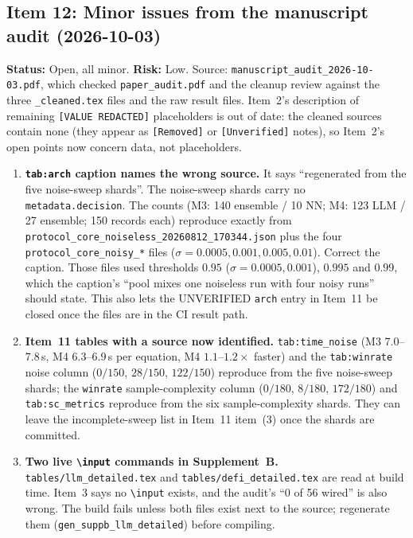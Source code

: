 \documentclass[11pt]{article}
\begin{document}
\subsection*{Item 12: Minor issues from the manuscript audit (2026-10-03)}
\textbf{Status:} Open, all minor. \textbf{Risk:} Low. Source: \texttt{manuscript\_audit\_2026-10-03.pdf}, which checked
\texttt{paper\_audit.pdf} and the cleanup review against the three \texttt{\_cleaned.tex} files and the raw result files.
Item~2's description of remaining \texttt{[VALUE REDACTED]} placeholders is out of date: the cleaned sources contain none (they
appear as \texttt{[Removed]} or \texttt{[Unverified]} notes), so Item~2's open points now concern data, not placeholders.
\begin{enumerate}
  \item \textbf{\texttt{tab:arch} caption names the wrong source.} It says ``regenerated from the five noise-sweep shards''.
    The noise-sweep shards carry no \texttt{metadata.decision}. The counts (M3: 140 ensemble / 10 NN; M4: 123 LLM / 27
    ensemble; 150 records each) reproduce exactly from \texttt{protocol\_core\_noiseless\_20260812\_170344.json} plus the four
    \texttt{protocol\_core\_noisy\_*} files ($\sigma=0.0005, 0.001, 0.005, 0.01$). Correct the caption. Those files
    used thresholds $0.95$ ($\sigma=0.0005, 0.001$), $0.995$ and $0.99$, which the caption's ``pool mixes one noiseless run with
    four noisy runs'' should state. This also lets the UNVERIFIED \texttt{arch} entry in Item~11 be closed once the files
    are in the CI result path.
  \item \textbf{Item~11 tables with a source now identified.} \texttt{tab:time\_noise} (M3 7.0--7.8\,s, M4 6.3--6.9\,s per
    equation, M4 $1.1$--$1.2\times$ faster) and the \texttt{tab:winrate} noise column ($0/150$, $28/150$, $122/150$) reproduce
    from the five noise-sweep shards; the \texttt{winrate} sample-complexity column ($0/180$, $8/180$, $172/180$) and
    \texttt{tab:sc\_metrics} reproduce from the six sample-complexity shards. They can leave the incomplete-sweep list in
    Item~11 item~(3) once the shards are committed.
  \item \textbf{Two live \texttt{\textbackslash input} commands in Supplement~B.} \texttt{tables/llm\_detailed.tex} and
    \texttt{tables/defi\_detailed.tex} are read at build time. Item~3 says no \texttt{\textbackslash input} exists, and the
    audit's ``0 of 56 wired'' is also wrong. The build fails unless both files exist next to the source; regenerate them
    (\texttt{gen\_suppb\_llm\_detailed}) before compiling.

\end{enumerate}
\end{document}
